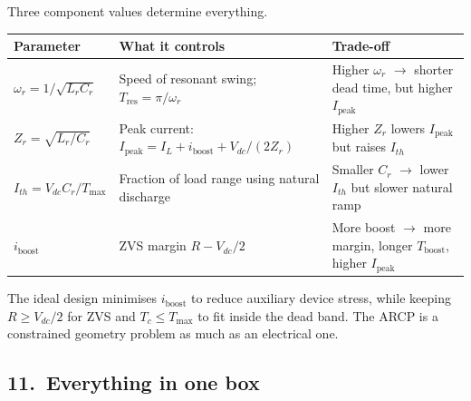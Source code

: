\documentclass[12pt, a4paper]{article}
\newcommand{\Vdc}{V_{dc}}
\newcommand{\IL}{I_L}
\newcommand{\Lr}{L_r}
\newcommand{\Cr}{C_r}
\newcommand{\omegar}{\omega_r}
\newcommand{\Zr}{Z_r}
\newcommand{\Ith}{I_{th}}
\begin{document}
Three component values determine everything.

\begin{center}
\renewcommand{\arraystretch}{1.6}
\begin{tabular}{p{3.6cm} p{5.0cm} p{4.1cm}}
\toprule
\textbf{Parameter} & \textbf{What it controls} & \textbf{Trade-off} \\
\midrule
$\omegar = 1/\sqrt{\Lr\Cr}$
    & Speed of resonant swing; $T_\text{res} = \pi/\omegar$
    & Higher $\omegar$ $\to$ shorter dead time, but higher $I_\text{peak}$ \\
$\Zr = \sqrt{\Lr/\Cr}$
    & Peak current: $I_\text{peak} = \IL + i_\text{boost} + \Vdc/(2\Zr)$
    & Higher $\Zr$ lowers $I_\text{peak}$ but raises $\Ith$ \\
$\Ith = \Vdc\Cr/T_\text{max}$
    & Fraction of load range using natural discharge
    & Smaller $\Cr$ $\to$ lower $\Ith$ but slower natural ramp \\
$i_\text{boost}$
    & ZVS margin $R - \Vdc/2$
    & More boost $\to$ more margin, longer $T_\text{boost}$, higher $I_\text{peak}$ \\
\bottomrule
\end{tabular}
\end{center}

\noindent
The ideal design minimises $i_\text{boost}$ to reduce auxiliary device stress,
while keeping $R \geq \Vdc/2$ for ZVS and $T_c \leq T_\text{max}$ to fit
inside the dead band.
The ARCP is a constrained geometry problem as much as an electrical one.

\subsection*{11.\ Everything in one box}
\end{document}
